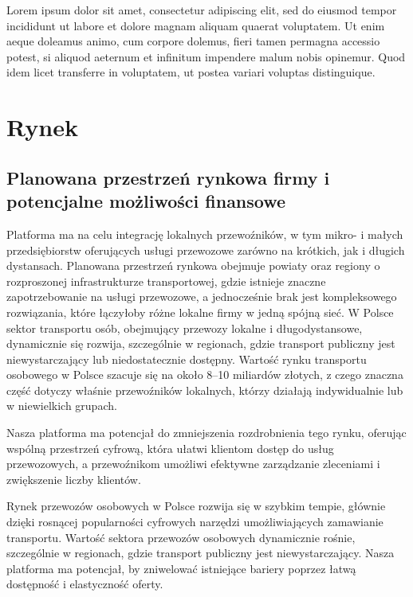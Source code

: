 Lorem ipsum dolor sit amet, consectetur adipiscing elit, sed do eiusmod tempor incididunt ut labore et dolore magnam aliquam quaerat voluptatem. Ut enim aeque doleamus animo, cum corpore dolemus, fieri tamen permagna accessio potest, si aliquod aeternum et infinitum impendere malum nobis opinemur. Quod idem licet transferre in voluptatem, ut postea variari voluptas distinguique.

\section{Rynek}
\subsection{Planowana przestrzeń rynkowa firmy i potencjalne możliwości finansowe}
Platforma ma na celu integrację lokalnych przewoźników, w tym mikro- i małych przedsiębiorstw oferujących usługi przewozowe zarówno na krótkich, jak i długich dystansach. Planowana przestrzeń rynkowa obejmuje powiaty oraz regiony o rozproszonej infrastrukturze transportowej, gdzie istnieje znaczne zapotrzebowanie na usługi przewozowe, a jednocześnie brak jest kompleksowego rozwiązania, które łączyłoby różne lokalne firmy w jedną spójną sieć.
W Polsce sektor transportu osób, obejmujący przewozy lokalne i długodystansowe, dynamicznie się rozwija, szczególnie w regionach, gdzie transport publiczny jest niewystarczający lub niedostatecznie dostępny. Wartość rynku transportu osobowego w Polsce szacuje się na około 8–10 miliardów złotych, z czego znaczna część dotyczy właśnie przewoźników lokalnych, którzy działają indywidualnie lub w niewielkich grupach.

Nasza platforma ma potencjał do zmniejszenia rozdrobnienia tego rynku, oferując wspólną przestrzeń cyfrową, która ułatwi klientom dostęp do usług przewozowych, a przewoźnikom umożliwi efektywne zarządzanie zleceniami i zwiększenie liczby klientów.

Rynek przewozów osobowych w Polsce rozwija się w szybkim tempie, głównie dzięki rosnącej popularności cyfrowych narzędzi umożliwiających zamawianie transportu. Wartość sektora przewozów osobowych dynamicznie rośnie, szczególnie w regionach, gdzie transport publiczny jest niewystarczający. Nasza platforma ma potencjał, by zniwelować istniejące bariery poprzez łatwą dostępność i elastyczność oferty.

